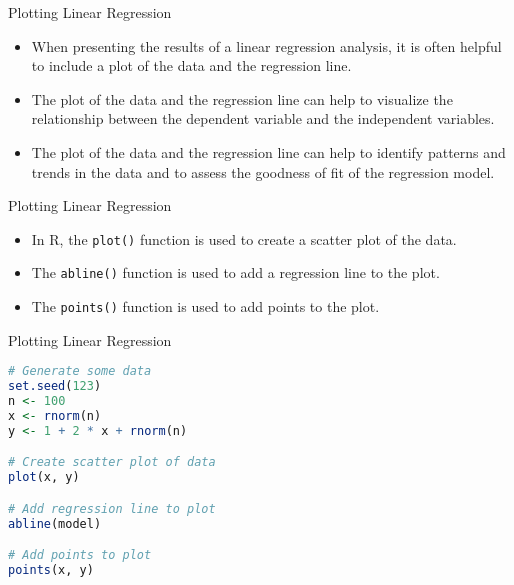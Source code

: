 \documentclass[serif, 9pt, aspectratio=32]{beamer}
\begin{document}
\begin{frame}{Plotting Linear Regression}
    \begin{itemize}
        \setlength{\itemsep}{2em}
        \item When presenting the results of a linear regression analysis, it is often helpful to include a plot of the data and the regression line.
        \item The plot of the data and the regression line can help to visualize the relationship between the dependent variable and the independent variables.
        \item The plot of the data and the regression line can help to identify patterns and trends in the data and to assess the goodness of fit of the regression model.
    \end{itemize}
\end{frame}

\begin{frame}{Plotting Linear Regression}
    \begin{itemize}
        \setlength{\itemsep}{2em}
        \item In R, the \texttt{plot()} function is used to create a scatter plot of the data.
        \item The \texttt{abline()} function is used to add a regression line to the plot.
        \item The \texttt{points()} function is used to add points to the plot.
    \end{itemize}
\end{frame}

\begin{frame}[fragile]{Plotting Linear Regression}
    \begin{lstlisting}[language=R]
# Generate some data
set.seed(123)
n <- 100
x <- rnorm(n)
y <- 1 + 2 * x + rnorm(n)

# Create scatter plot of data
plot(x, y)

# Add regression line to plot
abline(model)

# Add points to plot
points(x, y)
    \end{lstlisting}
\end{frame}
\end{document}
